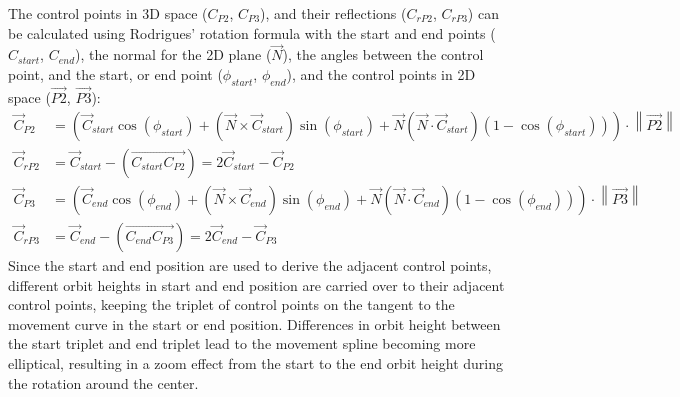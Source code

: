The control points in 3D space ($C_{P2}$, $C_{P3}$), and their reflections ($C_{rP2}$, $C_{rP3}$) can be calculated
using Rodrigues' rotation formula with the start and end points ($C_{start}$, $C_{end}$), the normal for the 2D plane
($\vec{N}$), the angles between the control point, and the start, or end point ($\phi_{start}$, $\phi_{end}$), and the
control points in 2D space ($\overrightarrow{P2}$, $\overrightarrow{P3}$):
\begin{equation}
    \label{eq:control-point-transformation}
    \begin{aligned}
        \vec{C}_{P2} &= \left(
            \vec{C}_{start} \cos(\phi_{start}) +
            ( \vec{N} \times \vec{C}_{start} )\sin(\phi_{start}) +
            \vec{N} ( \vec{N} \cdot \vec{C}_{start} )( 1 - \cos(\phi_{start}) )
        \right) \cdot \left\| \overrightarrow{P2} \right\|
        \\
        \vec{C}_{rP2} &= \vec{C}_{start} - \left( \overrightarrow{C_{start}C_{P2}} \right) =
        2\vec{C}_{start} - \vec{C}_{P2}
        \\
        \vec{C}_{P3} &= \left(
            \vec{C}_{end} \cos(\phi_{end}) +
            ( \vec{N} \times \vec{C}_{end} )\sin(\phi_{end}) +
            \vec{N} ( \vec{N} \cdot \vec{C}_{end} )( 1 - \cos(\phi_{end}) )
        \right) \cdot \left\| \overrightarrow{P3} \right\|
        \\
        \vec{C}_{rP3} &= \vec{C}_{end} - \left( \overrightarrow{C_{end}C_{P3}} \right) =
        2\vec{C}_{end} - \vec{C}_{P3}
    \end{aligned}
\end{equation}
Since the start and end position are used to derive the adjacent control points, different orbit heights in start and
end position are carried over to their adjacent control points, keeping the triplet of control points on the tangent
to the movement curve in the start or end position.
Differences in orbit height between the start triplet and end triplet lead to the movement spline becoming more
elliptical, resulting in a zoom effect from the start to the end orbit height during the rotation around the center.

